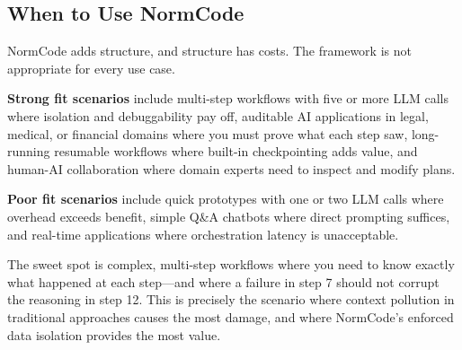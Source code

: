 \subsection{When to Use NormCode}

NormCode adds structure, and structure has costs. The framework is not appropriate for every use case.

\textbf{Strong fit scenarios} include multi-step workflows with five or more LLM calls where isolation and debuggability pay off, auditable AI applications in legal, medical, or financial domains where you must prove what each step saw, long-running resumable workflows where built-in checkpointing adds value, and human-AI collaboration where domain experts need to inspect and modify plans.

\textbf{Poor fit scenarios} include quick prototypes with one or two LLM calls where overhead exceeds benefit, simple Q\&A chatbots where direct prompting suffices, and real-time applications where orchestration latency is unacceptable.

The sweet spot is complex, multi-step workflows where you need to know exactly what happened at each step---and where a failure in step 7 should not corrupt the reasoning in step 12. This is precisely the scenario where context pollution in traditional approaches causes the most damage, and where NormCode's enforced data isolation provides the most value.

